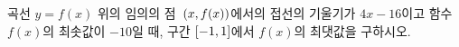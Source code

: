 곡선 $y=f(x)$ 위의 임의의 점~$(x{,}\mkern3mu\mathopen{}f(x))$에서의 접선의 기울기가 $4x-16$이고 함수 $f(x)$의 최솟값이 $-10$일 때, 구간 $[-1{,}\mkern3mu\mathopen{}1]$에서 $f(x)$의 최댓값을 구하시오.
